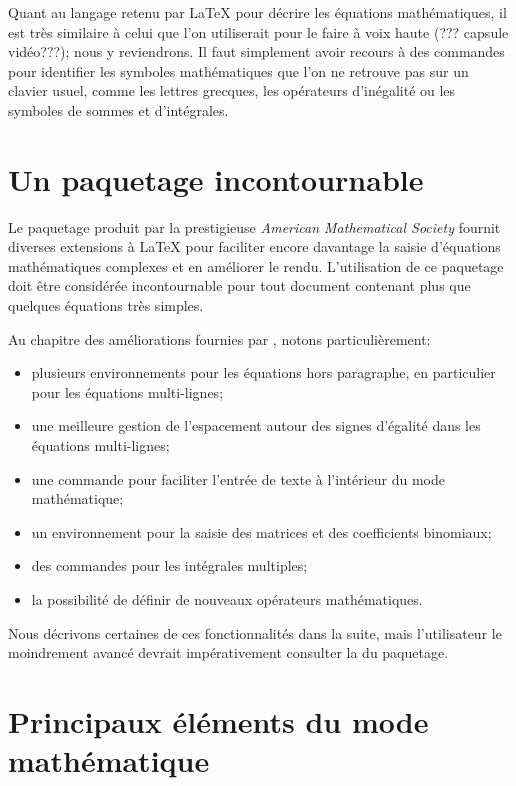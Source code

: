 Quant au langage retenu par {\LaTeX} pour décrire les équations
mathématiques, il est très similaire à celui que l'on utiliserait pour
le faire à voix haute (??? capsule vidéo???); nous y reviendrons. Il faut simplement avoir
recours à des commandes pour identifier les symboles mathématiques que
l'on ne retrouve pas sur un clavier usuel, comme les lettres grecques,
les opérateurs d'inégalité ou les symboles de sommes et d'intégrales.


\section{Un paquetage incontournable}
\label{sec:math:amsmath}

Le paquetage  \citep{amsmath} produit par la prestigieuse
\emph{American Mathematical Society} fournit diverses extensions à
{\LaTeX} pour faciliter encore davantage la saisie d'équations
mathématiques complexes et en améliorer le rendu. L'utilisation de ce
paquetage doit être considérée incontournable pour tout document
contenant plus que quelques équations très simples.

Au chapitre des améliorations fournies par , notons
particulièrement:
\begin{itemize}
\item plusieurs environnements pour les équations hors paragraphe, en
  particulier pour les équations multi-lignes;
\item une meilleure gestion de l'espacement autour des signes
  d'égalité dans les équations multi-lignes;
\item une commande pour faciliter l'entrée de texte à l'intérieur du
  mode mathématique;
\item un environnement pour la saisie des matrices et des coefficients
  binomiaux;
\item des commandes pour les intégrales multiples;
\item la possibilité de définir de nouveaux opérateurs mathématiques.
\end{itemize}
Nous décrivons certaines de ces fonctionnalités dans la suite, mais
l'utilisateur le moindrement avancé devrait impérativement consulter
la %
du paquetage.


\section{Principaux éléments du mode mathématique}
\label{sec:math:bases}

